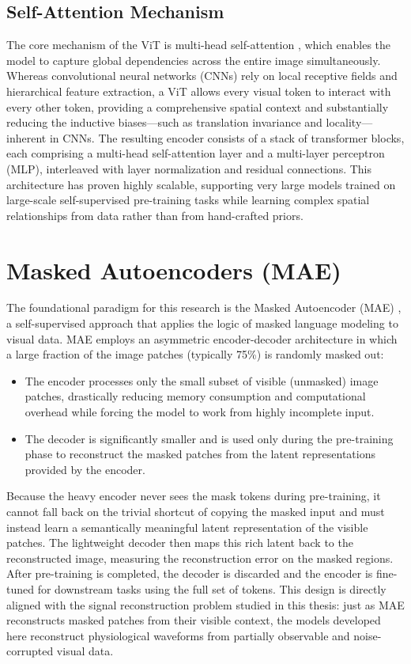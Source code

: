 \subsection{Self-Attention Mechanism}
The core mechanism of the ViT is multi-head self-attention
\cite{vaswani2017attention}, which enables the model to capture global
dependencies across the entire image simultaneously. Whereas convolutional
neural networks (CNNs) rely on local receptive fields and hierarchical feature
extraction, a ViT allows every visual token to interact with every other token,
providing a comprehensive spatial context and substantially reducing the
inductive biases---such as translation invariance and locality---inherent in
CNNs. The resulting encoder consists of a stack of transformer blocks, each
comprising a multi-head self-attention layer and a multi-layer perceptron (MLP),
interleaved with layer normalization and residual connections. This architecture
has proven highly scalable, supporting very large models trained on large-scale
self-supervised pre-training tasks \cite{he2022masked} while learning complex
spatial relationships from data rather than from hand-crafted priors.

\section{Masked Autoencoders (MAE)}
\label{sec:mae}
The foundational paradigm for this research is the Masked Autoencoder (MAE)
\cite{he2022masked}, a self-supervised approach that applies the logic of masked
language modeling to visual data. MAE employs an asymmetric encoder-decoder
architecture in which a large fraction of the image patches (typically 75\%) is
randomly masked out:
\begin{itemize}
    \item The encoder processes only the small subset of visible (unmasked)
        image patches, drastically reducing memory consumption and computational
        overhead while forcing the model to work from highly incomplete input.

    \item The decoder is significantly smaller and is used only during the
        pre-training phase to reconstruct the masked patches from the latent
        representations provided by the encoder.
\end{itemize}
Because the heavy encoder never sees the mask tokens during pre-training, it
cannot fall back on the trivial shortcut of copying the masked input and must
instead learn a semantically meaningful latent representation of the visible
patches. The lightweight decoder then maps this rich latent back to the
reconstructed image, measuring the reconstruction error on the masked regions.
After pre-training is completed, the decoder is discarded and the encoder is
fine-tuned for downstream tasks using the full set of tokens. This design is
directly aligned with the signal reconstruction problem studied in this thesis:
just as MAE reconstructs masked patches from their visible context, the models
developed here reconstruct physiological waveforms from partially observable and
noise-corrupted visual data.
